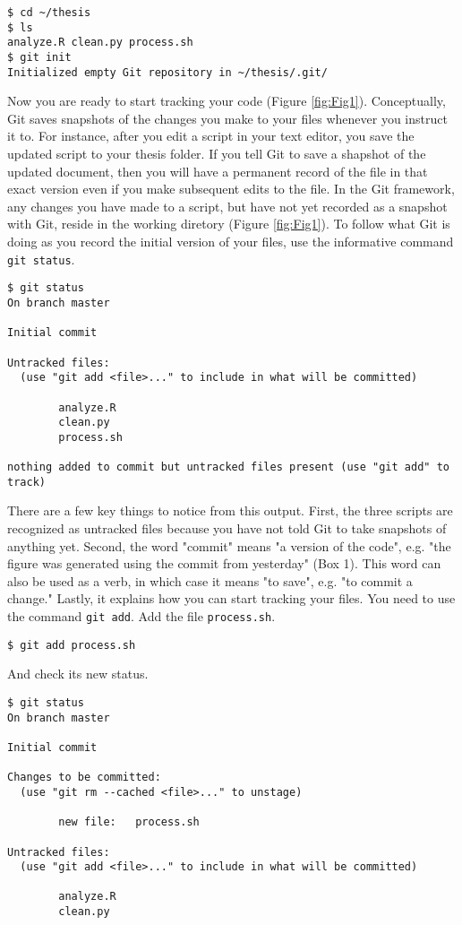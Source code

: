 \begin{lstlisting}
$ cd ~/thesis
$ ls
analyze.R clean.py process.sh
$ git init
Initialized empty Git repository in ~/thesis/.git/
\end{lstlisting}

Now you are ready to start tracking your code (Figure \ref{fig:Fig1}).
Conceptually, Git saves snapshots of the changes you make to your files whenever you instruct it to.
For instance, after you edit a script in your text editor, you save the updated script to your thesis folder.
If you tell Git to save a shapshot of the updated document, then you will have a permanent record of the file in that exact version even if you make subsequent edits to the file.
In the Git framework, any changes you have made to a script, but have not yet recorded as a snapshot with Git, reside in the working diretory (Figure \ref{fig:Fig1}).
To follow what Git is doing as you record the initial version of your files, use the informative command \verb|git status|.

\begin{lstlisting}
$ git status
On branch master

Initial commit

Untracked files:
  (use "git add <file>..." to include in what will be committed)

        analyze.R
        clean.py
        process.sh

nothing added to commit but untracked files present (use "git add" to track)
\end{lstlisting}

There are a few key things to notice from this output.
First, the three scripts are recognized as untracked files because you have not told Git to take snapshots of anything yet.
Second, the word "commit" means "a version of the code", e.g. "the figure was generated using the commit from yesterday" (Box 1).
This word can also be used as a verb, in which case it means "to save", e.g. "to commit a change."
Lastly, it explains how you can start tracking your files.
You need to use the command \verb|git add|.
Add the file \verb|process.sh|.

\begin{lstlisting}
$ git add process.sh
\end{lstlisting}

And check its new status.

\begin{lstlisting}
$ git status
On branch master

Initial commit

Changes to be committed:
  (use "git rm --cached <file>..." to unstage)

        new file:   process.sh

Untracked files:
  (use "git add <file>..." to include in what will be committed)

        analyze.R
        clean.py
\end{lstlisting}

